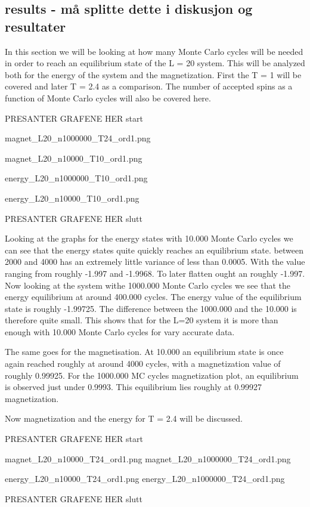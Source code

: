 \documentclass{article}
\begin{document}
\subsection{results - må splitte dette i diskusjon og resultater}
In this section we will be looking at how many Monte Carlo cycles will be needed in order to reach an equilibrium state of the L = 20 system. This will be analyzed both for the energy of the system and the magnetization. First the T = 1 will be covered and later T = 2.4 as a comparison. The number of accepted spins as a function of Monte Carlo cycles will also be covered here.

PRESANTER GRAFENE HER start


magnet\_L20\_n1000000\_T24\_ord1.png

magnet\_L20\_n10000\_T10\_ord1.png

energy\_L20\_n1000000\_T10\_ord1.png

energy\_L20\_n10000\_T10\_ord1.png

PRESANTER GRAFENE HER slutt

Looking at the graphs for the energy states with 10.000 Monte Carlo cycles we can see that the energy states quite quickly reaches an equilibrium state. between 2000 and 4000 has an extremely little variance of less than 0.0005. With the value ranging from roughly -1.997 and -1.9968. To later flatten ought an roughly -1.997. Now looking at the system withe 1000.000 Monte Carlo cycles we see that the energy equilibrium at around 400.000 cycles. The energy value of the equilibrium state is roughly -1.99725. The difference between the 1000.000 and the 10.000 is therefore quite small. This shows that for the L=20 system it is more than enough with 10.000 Monte Carlo cycles for vary accurate data.

The same goes for the magnetisation. At 10.000 an equilibrium state is once again reached roughly at around 4000 cycles, with a magnetization value of roughly 0.99925. For the 1000.000 MC cycles magnetization plot, an equilibrium is observed just under 0.9993. This equilibrium lies roughly at 0.99927 magnetization.

Now magnetization and the energy for T = 2.4 will be discussed.

PRESANTER GRAFENE HER start

magnet\_L20\_n10000\_T24\_ord1.png
magnet\_L20\_n1000000\_T24\_ord1.png

energy\_L20\_n10000\_T24\_ord1.png
energy\_L20\_n1000000\_T24\_ord1.png

PRESANTER GRAFENE HER slutt
\end{document}
